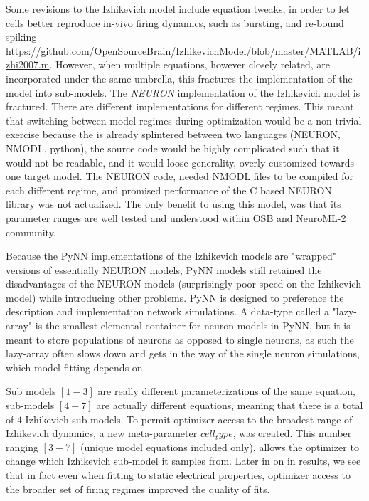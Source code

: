 Some revisions to the Izhikevich model include equation tweaks, in order to let cells better reproduce in-vivo firing dynamics, such as bursting, and re-bound spiking \url{https://github.com/OpenSourceBrain/IzhikevichModel/blob/master/MATLAB/izhi2007.m}. However, when multiple equations, however closely related, are incorporated under the same umbrella, this fractures the implementation of the model into sub-models. The \emph{NEURON} implementation of the Izhikevich model is fractured. There are different implementations for different regimes. This meant that switching between model regimes during optimization would be a non-trivial exercise because the is already splintered between two languages (NEURON, NMODL, python), the source code would be highly complicated such that it would not be readable, and it would loose generality, overly customized towards one target model. The NEURON code, needed NMODL files to be compiled for each different regime, and promised performance of the C based NEURON library was not actualized. The only benefit to using this model, was that its parameter ranges are well tested and understood within OSB and NeuroML-2 community.

Because the PyNN implementations of the Izhikevich models are "wrapped" versions of essentially NEURON models, PyNN models still retained the disadvantages of the NEURON models (surprisingly poor speed on the Izhikevich model) while introducing other problems. PyNN is designed to preference the description and implementation network simulations. A data-type called a "lazy-array" is the smallest elemental container for neuron models in PyNN, but it is meant to store populations of neurons as opposed to single neurons, as such the lazy-array often slows down and gets in the way of the single neuron simulations, which model fitting depends on.

 Sub models $[1-3]$ are really different parameterizations of the same equation, sub-models $[4-7]$ are actually different equations, meaning that there is a total of $4$ Izhikevich sub-models. To permit optimizer access to the broadest range of Izhikevich dynamics, a new meta-parameter $cell_type$, was created. This number ranging $[3-7]$ (unique model equations included only), allows the optimizer to change which Izhikevich sub-model it samples from. Later in on in results, we see that in fact even when fitting to static electrical properties, optimizer access to the broader set of firing regimes improved the quality of fits.


